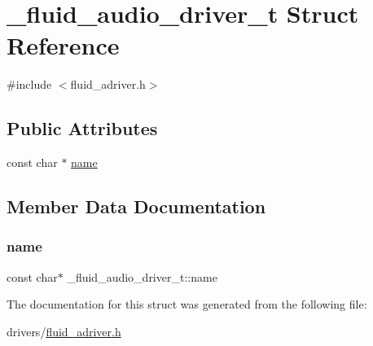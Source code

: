 \hypertarget{struct__fluid__audio__driver__t}{}\section{\+\_\+fluid\+\_\+audio\+\_\+driver\+\_\+t Struct Reference}
\label{struct__fluid__audio__driver__t}


{\ttfamily \#include $<$fluid\+\_\+adriver.\+h$>$}

\subsection*{Public Attributes}
\begin{DoxyCompactItemize}
\item 
const char $\ast$ \hyperlink{struct__fluid__audio__driver__t_a6dd9b496d11cb3d823de47f756d4b8e6}{name}
\end{DoxyCompactItemize}


\subsection{Member Data Documentation}
\mbox{\label{struct__fluid__audio__driver__t_a6dd9b496d11cb3d823de47f756d4b8e6}} 
\subsubsection{\texorpdfstring{name}{name}}
{\footnotesize\ttfamily const char$\ast$ \+\_\+fluid\+\_\+audio\+\_\+driver\+\_\+t\+::name}



The documentation for this struct was generated from the following file\+:\begin{DoxyCompactItemize}
\item 
drivers/\hyperlink{fluid__adriver_8h}{fluid\+\_\+adriver.\+h}\end{DoxyCompactItemize}
